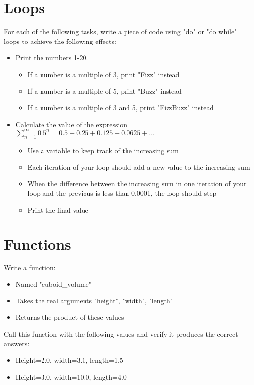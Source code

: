 \documentclass[11pt,a4paper]{article}
\begin{document}
\section{Loops}
For each of the following tasks, write a piece of code using "do" or "do while" loops to achieve the following effects:
\begin{itemize}
    \item Print the numbers 1-20.
    \begin{itemize}
        \item If a number is a multiple of 3, print "Fizz" instead
        \item If a number is a multiple of 5, print "Buzz" instead
        \item If a number is a multiple of 3 and 5, print "FizzBuzz" instead
    \end{itemize}
    \item Calculate the value of the expression $\sum\limits_{n=1}^{\infty}0.5^{n} = 0.5+0.25+0.125+0.0625+\hdots$
    \begin{itemize}
        \item Use a variable to keep track of the increasing sum
        \item Each iteration of your loop should add a new value to the increasing sum
        \item When the difference between the increasing sum in one iteration of your loop and the previous is less than 0.0001, the loop should stop
        \item Print the final value
    \end{itemize}
\end{itemize}

\section{Functions}
Write a function:
\begin{itemize}
    \item Named "cuboid\_volume"
    \item Takes the real arguments "height", "width", "length"
    \item Returns the product of these values
\end {itemize}
Call this function with the following values and verify it produces the correct answers:
\begin{itemize}
    \item Height=2.0, width=3.0, length=1.5
    \item Height=3.0, width=10.0, length=4.0
\end {itemize}
\end{document}
